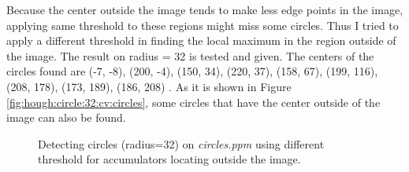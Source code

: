 \documentclass[paper=a4, fontsize=11pt]{scrartcl}
\begin{document}
Because the center outside the image tends to make less edge points in the image, applying same threshold to these regions might miss some circles. 
Thus I tried to apply a different threshold in finding the local maximum in the region outside of the image.
The result on radius = 32 is tested and given.
The centers of the circles found are (-7, -8), (200, -4), (150, 34), (220, 37), (158, 67), (199, 116), (208, 178), (173, 189), (186, 208) .
As it is shown in Figure \ref{fig:hough:circle:32:cv:circles}, some circles that have the center outside of the image can also be found.

\begin{figure}[h]
\centering
{}
\caption{Detecting circles (radius=32) on \emph{circles.ppm} using different threshold for accumulators locating outside the image.}
\label{fig:hough:circle:32:cv}
\end{figure}
\end{document}
